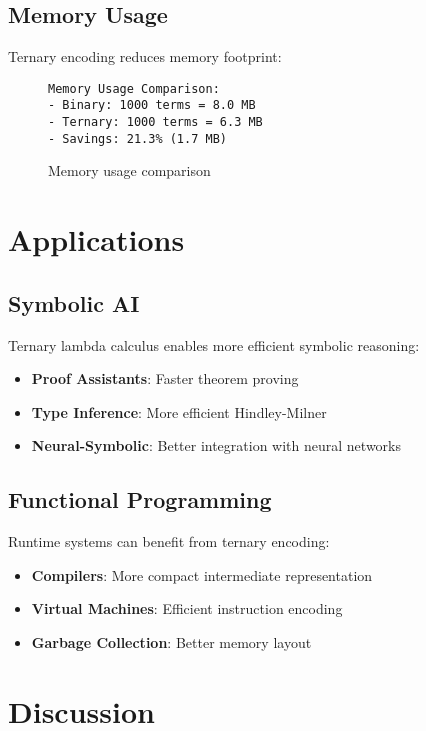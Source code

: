 \documentclass[11pt]{article}
\begin{document}
\subsection{Memory Usage}

Ternary encoding reduces memory footprint:

\begin{figure}[h]
\centering
\begin{verbatim}
Memory Usage Comparison:
- Binary: 1000 terms = 8.0 MB
- Ternary: 1000 terms = 6.3 MB
- Savings: 21.3% (1.7 MB)
\end{verbatim}
\caption{Memory usage comparison}
\end{figure}

\section{Applications}

\subsection{Symbolic AI}

Ternary lambda calculus enables more efficient symbolic reasoning:

\begin{itemize}
    \item \textbf{Proof Assistants}: Faster theorem proving
    \item \textbf{Type Inference}: More efficient Hindley-Milner
    \item \textbf{Neural-Symbolic}: Better integration with neural networks
\end{itemize}

\subsection{Functional Programming}

Runtime systems can benefit from ternary encoding:

\begin{itemize}
    \item \textbf{Compilers}: More compact intermediate representation
    \item \textbf{Virtual Machines}: Efficient instruction encoding
    \item \textbf{Garbage Collection}: Better memory layout
\end{itemize}

\section{Discussion}
\end{document}

